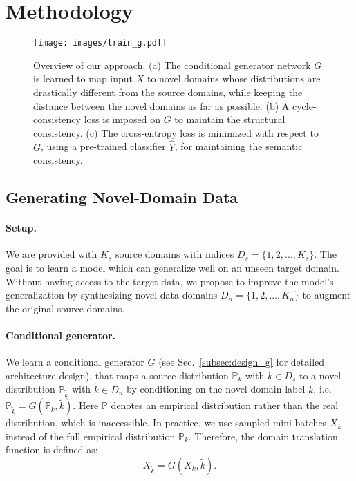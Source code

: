 \documentclass[runningheads]{llncs}
\begin{document}
\section{Methodology} \label{sec:method}

\begin{figure}[t]
    \centering
    \texttt{[image: images/train\_g.pdf]}
    \caption{Overview of our approach. (a) The conditional generator network $G$ is learned to map input $X$ to novel domains whose distributions are drastically different from the source domains, while keeping the distance between the novel domains as far as possible. (b) A cycle-consistency loss is imposed on $G$ to maintain the structural consistency. (c) The cross-entropy loss is minimized with respect to $G$, using a pre-trained classifier $\hat{Y}$, for maintaining the semantic consistency.}
    \label{fig:train_g}
\end{figure}

\subsection{Generating Novel-Domain Data} \label{subsec:generate_novel_domain} 

\paragraph{Setup.}
We are provided with $K_s$ source domains with indices $D_s = \{ 1,2,...,K_s \}$. The goal is to learn a model which can generalize well on an unseen target domain. Without having access to the target data, we propose to improve the model's generalization by synthesizing novel data domains $D_n = \{ 1,2,...,K_n \}$ to augment the original source domains.

\paragraph{Conditional generator.}
We learn a conditional generator $G$ (see Sec.~\ref{subsec:design_g} for detailed architecture design), that maps a source distribution $\mathbb{P}_k$ with $k \in D_s$ to a novel distribution $\mathbb{P}_{\tilde{k}}$ with $\tilde{k} \in D_n$ by conditioning on the novel domain label $\tilde{k}$, i.e. $\mathbb{P}_{\tilde{k}}=G(\mathbb{P}_{k},\tilde{k})$. Here $\mathbb{P}$ denotes an empirical distribution rather than the real distribution, which is inaccessible. In practice, we use sampled mini-batches $X_k$ instead of the full empirical distribution $\mathbb{P}_k$. Therefore, the domain translation function is defined as:
\begin{equation} \label{eq:conditional_g}
X_{\tilde{k}} = G(X_k, \tilde{k}).
\end{equation}
\end{document}
